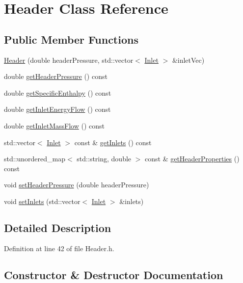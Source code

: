\hypertarget{class_header}{}\section{Header Class Reference}
\label{class_header}
\subsection*{Public Member Functions}
\begin{DoxyCompactItemize}
\item 
\hyperlink{class_header_a59b836abde0be58bec65ebea1ac67a3b}{Header} (double header\+Pressure, std\+::vector$<$ \hyperlink{class_inlet}{Inlet} $>$ \&inlet\+Vec)
\item 
double \hyperlink{class_header_adc2e6daaf9f5e633c3db96ff3990f1f6}{get\+Header\+Pressure} () const
\item 
double \hyperlink{class_header_af913dbf132f8cb3af6e6b374813acd93}{get\+Specific\+Enthalpy} () const
\item 
double \hyperlink{class_header_a2a30ee96fa76bab1533cb9ceea0c8af3}{get\+Inlet\+Energy\+Flow} () const
\item 
double \hyperlink{class_header_ad572e6144481b9e9f65004aacebd701c}{get\+Inlet\+Mass\+Flow} () const
\item 
std\+::vector$<$ \hyperlink{class_inlet}{Inlet} $>$ const  \& \hyperlink{class_header_a625d7317488c88c949acd05c72a7c54a}{get\+Inlets} () const
\item 
std\+::unordered\+\_\+map$<$ std\+::string, double $>$ const  \& \hyperlink{class_header_a12c910088b929c8346a21c631af1fd90}{get\+Header\+Properties} () const
\item 
void \hyperlink{class_header_a3af0b7964b74287ce0c662b9a88556ed}{set\+Header\+Pressure} (double header\+Pressure)
\item 
void \hyperlink{class_header_ae69b6f894210a6cd340e92222f8bc343}{set\+Inlets} (std\+::vector$<$ \hyperlink{class_inlet}{Inlet} $>$ \&inlets)
\end{DoxyCompactItemize}


\subsection{Detailed Description}


Definition at line 42 of file Header.\+h.



\subsection{Constructor \& Destructor Documentation}
\mbox{\label{class_header_a59b836abde0be58bec65ebea1ac67a3b}} 
